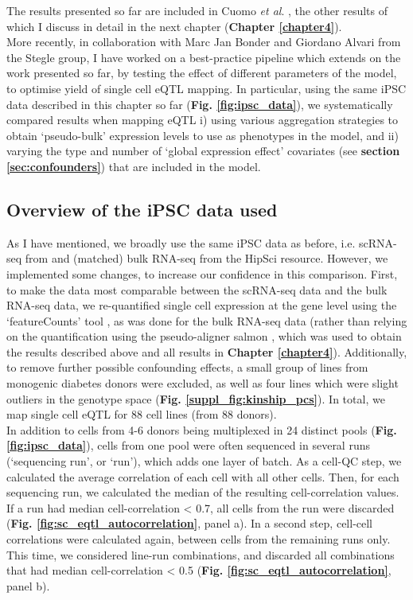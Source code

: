 The results presented so far are included in Cuomo \textit{et al}. \cite{cuomo2020single}, the other results of which I discuss in detail in the next chapter (\textbf{Chapter \ref{chapter4}}). \\

More recently, in collaboration with Marc Jan Bonder and Giordano Alvari from the Stegle group, I have worked on a best-practice pipeline which extends on the work presented so far, by testing the effect of different parameters of the model, to optimise yield of single cell eQTL mapping.
In particular, using the same iPSC data described in this chapter so far (\textbf{Fig. \ref{fig:ipsc_data}}), we systematically compared results when mapping eQTL i) using various aggregation strategies to obtain `pseudo-bulk' expression levels to use as phenotypes in the model, and ii) varying the type and number of `global expression effect' covariates (see \textbf{section \ref{sec:confounders}}) that are included in the model.

\subsection{Overview of the iPSC data used}

As I have mentioned, we broadly use the same iPSC data as before, i.e. scRNA-seq from \cite{cuomo2020single} and (matched) bulk RNA-seq from the HipSci resource.
However, we implemented some changes, to increase our confidence in this comparison. 
First, to make the data most comparable between the scRNA-seq data and the bulk RNA-seq data, we re-quantified single cell expression at the gene level using the `featureCounts' tool \cite{liao2014featurecounts}, as was done for the bulk RNA-seq data (rather than relying on the quantification using the pseudo-aligner salmon \cite{patro2017salmon}, which was used to obtain the results described above and all results in \textbf{Chapter \ref{chapter4}}).
Additionally, to remove further possible confounding effects, a small group of lines from monogenic diabetes donors were excluded, as well as four lines which were slight outliers in the genotype space (\textbf{Fig. \ref{suppl_fig:kinship_pcs}}).
In total, we map single cell eQTL for 88 cell lines (from 88 donors). \\

In addition to cells from 4-6 donors being multiplexed in 24 distinct pools (\textbf{Fig. \ref{fig:ipsc_data}}), cells from one pool were often sequenced in several runs (`sequencing run', or `run'), which adds one layer of batch.
As a cell-QC step, we calculated the average correlation of each cell with all other cells.
Then, for each sequencing run, we calculated the median of the resulting cell-correlation values.
If a run had median cell-correlation < 0.7, all cells from the run were discarded (\textbf{Fig. \ref{fig:sc_eqtl_autocorrelation}}, panel a).
In a second step, cell-cell correlations were calculated again, between cells from the remaining runs only.
This time, we considered line-run combinations, and discarded all combinations that had median cell-correlation < 0.5 (\textbf{Fig. \ref{fig:sc_eqtl_autocorrelation}}, panel b). \\

